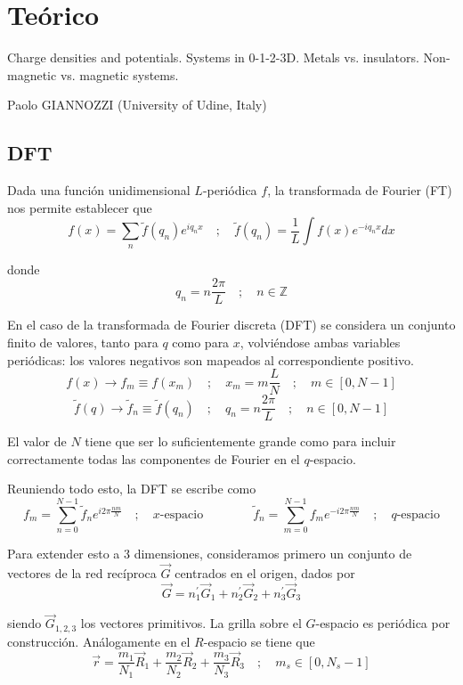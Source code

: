 \section{Teórico}

   Charge densities and potentials. Systems in 0-1-2-3D. Metals vs. insulators. Non-magnetic vs. magnetic systems.

   Paolo GIANNOZZI (University of Udine, Italy)

\subsection{DFT}

  Dada una función unidimensional $L$-periódica $f$, la transformada de Fourier (FT) nos permite establecer que
    $$f(x) = \sum_n \tilde{f} (q_n) e^{iq_n x} \quad ; \quad \tilde{f} (q_n) = \frac{1}{L} \int f(x) e^{-iq_n x} dx$$

  donde
    $$q_n = n \frac{2\pi}{L} \quad ; \quad n \in \mathbb{Z}$$

  En el caso de la transformada de Fourier discreta (DFT) se considera un conjunto finito de valores, tanto para $q$ como para $x$, volviéndose ambas variables periódicas: los valores negativos son mapeados al correspondiente positivo.
    $$f(x) \rightarrow f_m \equiv f(x_m) \quad ; \quad x_m = m \frac{L}{N} \quad ; \quad m \in [0, N-1]$$
    $$\tilde{f}(q) \rightarrow \tilde{f}_n \equiv \tilde{f}(q_n) \quad ; \quad q_n = n \frac{2\pi}{L} \quad ; \quad n \in [0, N-1]$$

  El valor de $N$ tiene que ser lo suficientemente grande como para incluir correctamente todas las componentes de Fourier en el $q$-espacio.

  Reuniendo todo esto, la DFT se escribe como
    $$f_m = \sum_{n=0}^{N-1} \tilde{f}_n e^{i2\pi \frac{nm}{N}} \quad ; \quad x\text{-espacio}
    \quad\quad\quad\quad
    \tilde{f}_n = \sum_{m=0}^{N-1} f_m e^{-i2\pi \frac{nm}{N}} \quad ; \quad q\text{-espacio}$$

  Para extender esto a 3 dimensiones, consideramos primero un conjunto de vectores de la red recíproca $\vec{G}$ centrados en el origen, dados por
    $$\vec{G} = n_1^{'} \vec{G}_1 + n_2^{'} \vec{G}_2 + n_3^{'} \vec{G}_3$$

  siendo $\vec{G}_{1,2,3}$ los vectores primitivos. La grilla sobre el $G$-espacio es periódica por construcción. Análogamente en el $R$-espacio se tiene que
    $$\vec{r} = \frac{m_1}{N_1} \vec{R}_1 + \frac{m_2}{N_2} \vec{R}_2 + \frac{m_3}{N_3} \vec{R}_3 \quad ; \quad m_s\in[0, N_s - 1]$$

